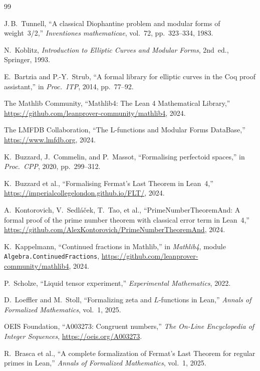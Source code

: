 \documentclass[11pt,a4paper]{article}
\theoremstyle{definition}
\begin{document}

\begin{thebibliography}{99}

J.\,B.~Tunnell,
``A classical Diophantine problem and modular forms of weight~3/2,''
\emph{Inventiones mathematicae}, vol.~72, pp.~323--334, 1983.

N.~Koblitz,
\emph{Introduction to Elliptic Curves and Modular Forms},
2nd~ed., Springer, 1993.

E.~Bartzia and P.-Y.~Strub,
``A formal library for elliptic curves in the Coq proof assistant,''
in \emph{Proc.\ ITP}, 2014, pp.~77--92.

The Mathlib Community,
``Mathlib4: The Lean 4 Mathematical Library,''
\url{https://github.com/leanprover-community/mathlib4}, 2024.

The LMFDB Collaboration,
``The L-functions and Modular Forms DataBase,''
\url{https://www.lmfdb.org}, 2024.

K.~Buzzard, J.~Commelin, and P.~Massot,
``Formalising perfectoid spaces,''
in \emph{Proc.\ CPP}, 2020, pp.~299--312.

K.~Buzzard et al.,
``Formalising Fermat's Last Theorem in Lean~4,''
\url{https://imperialcollegelondon.github.io/FLT/}, 2024.

A.~Kontorovich, V.~Sedl\'{a}\v{c}ek, T.~Tao, et al.,
``PrimeNumberTheoremAnd: A formal proof of the prime number
theorem with classical error term in Lean~4,''
\url{https://github.com/AlexKontorovich/PrimeNumberTheoremAnd},
2024.

K.~Kappelmann,
``Continued fractions in Mathlib,''
in \emph{Mathlib4}, module \texttt{Algebra.ContinuedFractions},
\url{https://github.com/leanprover-community/mathlib4}, 2024.

P.~Scholze,
``Liquid tensor experiment,''
\emph{Experimental Mathematics}, 2022.

D.~Loeffler and M.~Stoll,
``Formalizing zeta and $L$-functions in Lean,''
\emph{Annals of Formalized Mathematics}, vol.~1, 2025.

OEIS Foundation,
``A003273: Congruent numbers,''
\emph{The On-Line Encyclopedia of Integer Sequences},
\url{https://oeis.org/A003273}.

R.~Brasca et al.,
``A complete formalization of Fermat's Last Theorem for regular
primes in Lean,''
\emph{Annals of Formalized Mathematics}, vol.~1, 2025.

\end{thebibliography}
\end{document}
